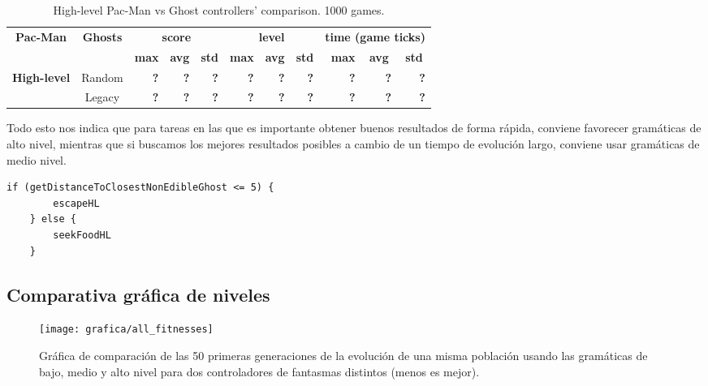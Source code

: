 \begin{table}[]
\centering
\begin{tabular}{|l|c|r|r|r|r|r|r|r|r|r|}
\hline
\multicolumn{1}{|c|}{\multirow{2}{*}{\textbf{Pac-Man}}} & \multirow{2}{*}{\textbf{Ghosts}} & \multicolumn{3}{c|}{\textbf{score}} & \multicolumn{3}{c|}{\textbf{level}} & \multicolumn{3}{c|}{\textbf{time (game ticks)}} \\ \cline{3-11} 
\multicolumn{1}{|c|}{} &  & \textbf{max} & \multicolumn{1}{c|}{\textbf{avg}} & \multicolumn{1}{c|}{\textbf{std}} & \textbf{max} & \multicolumn{1}{c|}{\textbf{avg}} & \multicolumn{1}{c|}{\textbf{std}} & \textbf{max} & \multicolumn{1}{c|}{\textbf{avg}} & \multicolumn{1}{c|}{\textbf{std}} \\ \hline
\multirow{2}{*}{\textbf{High-level}} & Random & \multicolumn{1}{r|}{\textbf{?}} & \textbf{?} & \textbf{?} & \multicolumn{1}{r|}{\textbf{?}} & \textbf{?} & \textbf{?} & \multicolumn{1}{r|}{\textbf{?}} & \textbf{?} & \textbf{?} \\ \cline{2-11} 
 & Legacy & \multicolumn{1}{r|}{\textbf{?}} & \textbf{?} & \textbf{?} & \multicolumn{1}{r|}{\textbf{?}} & \textbf{?} & \textbf{?} & \multicolumn{1}{r|}{\textbf{?}} & \textbf{?} & \textbf{?} \\ \hline
\end{tabular}
\caption{High-level Pac-Man vs Ghost controllers' comparison. 1000 games.}
\label{table:single_obj_high}
\end{table}

Todo esto nos indica que para tareas en las que es importante obtener buenos resultados de forma rápida, conviene favorecer gramáticas de alto nivel, mientras que si buscamos los mejores resultados posibles a cambio de un tiempo de evolución largo, conviene usar gramáticas de medio nivel.

\begin{lstlisting}[caption={Ejemplo de bot producido al evolucionar usando la gramática de alto nivel (mismo resultado entrenando tanto contra Random Ghosts como Legacy Ghosts).}]
    if (getDistanceToClosestNonEdibleGhost <= 5) {
        escapeHL
    } else {
        seekFoodHL
    }
\end{lstlisting}

\subsection{Comparativa gráfica de niveles}
\begin{figure}[H]
\centering
\texttt{[image: grafica/all\_fitnesses]}
\label{grafica:comparacion-todas}
\caption{Gráfica de comparación de las 50 primeras generaciones de la evolución de una misma población usando las gramáticas de bajo, medio y alto nivel para dos controladores de fantasmas distintos (menos es mejor).}
\end{figure}

